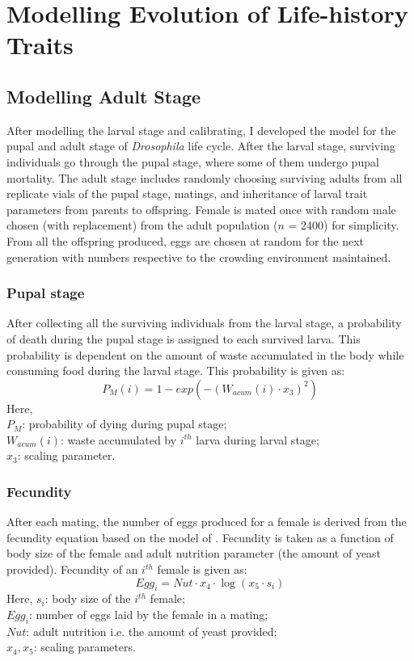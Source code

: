 \chapter{Modelling Evolution of Life-history Traits}
\section{Modelling Adult Stage}
After modelling the larval stage and calibrating, I developed the model for the pupal and adult stage of \textit{Drosophila} life cycle. After the larval stage, surviving individuals go through the pupal stage, where some of them undergo pupal mortality. The adult stage includes randomly choosing surviving adults from all replicate vials of the pupal stage, matings, and inheritance of larval trait parameters from parents to offspring. Female is mated once with random male chosen (with replacement) from the adult population ($n$ = 2400) for simplicity. From all the offspring produced, eggs are chosen at random for the next generation with numbers respective to the crowding environment maintained.
\subsection{Pupal stage}
After collecting all the surviving individuals from the larval stage, a probability of death during the pupal stage is assigned to each survived larva. This probability is dependent on the amount of waste accumulated in the body while consuming food during the larval stage. This probability is given as:
\[P_{M}(i) = 1 - exp(-(W_{acum}(i) \cdot x_{3})^{2})\]
Here, \\
$P_{M}$: probability of dying during pupal stage; \\
$W_{acum}(i)$: waste accumulated by $i^{th}$ larva during larval stage; \\
$x_{3}$: scaling parameter.
\subsection{Fecundity}
After each mating, the number of eggs produced for a female is derived from the fecundity equation based on the model of \citep{tungComplexInteractionResource2019}. Fecundity is taken as a function of body size of the female and adult nutrition parameter (the amount of yeast provided). Fecundity of an $i^{th}$ female is given as:
\[Egg_{i} = Nut \cdot x_{4} \cdot \log{(x_{5} \cdot s_{i})}\]
Here, $s_{i}$: body size of the $i^{th}$ female; \\
$Egg_{i}$: number of eggs laid by the female in a mating; \\
$Nut$: adult nutrition i.e. the amount of yeast provided; \\
$x_{4}, x_{5}$: scaling parameters.
